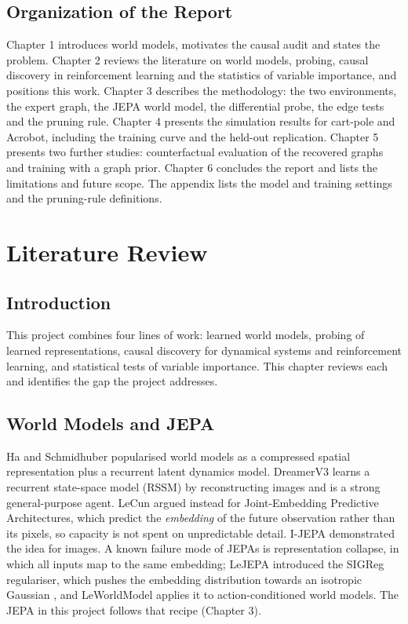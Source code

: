 \documentclass[11pt, a4paper, oneside,enumerate,textcomp]{report}
\begin{document}
\section{Organization of the Report}

Chapter 1 introduces world models, motivates the causal audit and states the problem. Chapter 2 reviews the literature on world models, probing, causal discovery in reinforcement learning and the statistics of variable importance, and positions this work. Chapter 3 describes the methodology: the two environments, the expert graph, the JEPA world model, the differential probe, the edge tests and the pruning rule. Chapter 4 presents the simulation results for cart-pole and Acrobot, including the training curve and the held-out replication. Chapter 5 presents two further studies: counterfactual evaluation of the recovered graphs and training with a graph prior. Chapter 6 concludes the report and lists the limitations and future scope. The appendix lists the model and training settings and the pruning-rule definitions.


\chapter{Literature Review}
\thispagestyle{empty}

\section{Introduction}

This project combines four lines of work: learned world models, probing of learned representations, causal discovery for dynamical systems and reinforcement learning, and statistical tests of variable importance. This chapter reviews each and identifies the gap the project addresses.

\section{World Models and JEPA}

Ha and Schmidhuber \cite{ha2018world} popularised world models as a compressed spatial representation plus a recurrent latent dynamics model. DreamerV3 \cite{hafner2025dreamerv3} learns a recurrent state-space model (RSSM) by reconstructing images and is a strong general-purpose agent. LeCun \cite{lecun2022path} argued instead for Joint-Embedding Predictive Architectures, which predict the \emph{embedding} of the future observation rather than its pixels, so capacity is not spent on unpredictable detail. I-JEPA \cite{assran2023ijepa} demonstrated the idea for images. A known failure mode of JEPAs is representation collapse, in which all inputs map to the same embedding; LeJEPA introduced the SIGReg regulariser, which pushes the embedding distribution towards an isotropic Gaussian \cite{balestriero2025lejepa}, and LeWorldModel \cite{lewm2026} applies it to action-conditioned world models. The JEPA in this project follows that recipe (Chapter 3).
\end{document}
